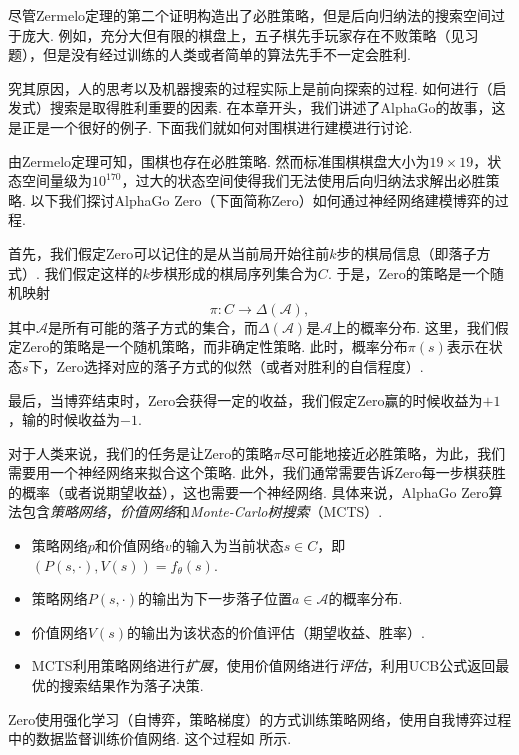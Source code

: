 尽管Zermelo定理的第二个证明构造出了必胜策略，但是后向归纳法的搜索空间过于庞大. 例如，充分大但有限的棋盘上，五子棋先手玩家存在不败策略（见习题），但是没有经过训练的人类或者简单的算法先手不一定会胜利. 

究其原因，人的思考以及机器搜索的过程实际上是前向探索的过程. 如何进行（启发式）搜索是取得胜利重要的因素. 在本章开头，我们讲述了AlphaGo的故事，这是正是一个很好的例子. 下面我们就如何对围棋进行建模进行讨论.

由Zermelo定理可知，围棋也存在必胜策略. 然而标准围棋棋盘大小为$19\times 19$，状态空间量级为$10^{170}$，过大的状态空间使得我们无法使用后向归纳法求解出必胜策略. 以下我们探讨AlphaGo Zero（下面简称Zero）如何通过神经网络建模博弈的过程.

首先，我们假定Zero可以记住的是从当前局开始往前$k$步的棋局信息（即落子方式）. 我们假定这样的$k$步棋形成的棋局序列集合为$C$. 于是，Zero的策略是一个随机映射
\[\pi: C\to \Delta(\mathcal A),\]
其中$\mathcal A$是所有可能的落子方式的集合，而$\Delta(\mathcal A)$是$\mathcal A$上的概率分布. 这里，我们假定Zero的策略是一个随机策略，而非确定性策略. 此时，概率分布$\pi(s)$表示在状态$s$下，Zero选择对应的落子方式的似然（或者对胜利的自信程度）.

最后，当博弈结束时，Zero会获得一定的收益，我们假定Zero赢的时候收益为$+1$，输的时候收益为$-1$. 

对于人类来说，我们的任务是让Zero的策略$\pi$尽可能地接近必胜策略，为此，我们需要用一个神经网络来拟合这个策略. 此外，我们通常需要告诉Zero每一步棋获胜的概率（或者说期望收益），这也需要一个神经网络. 具体来说，AlphaGo Zero算法包含\textit{策略网络}，\textit{价值网络}和\textit{Monte-Carlo树搜索}（MCTS）.
\begin{itemize}
    \item 策略网络$p$和价值网络$v$的输入为当前状态$s\in C$，即$(P(s,\cdot),V(s))=f_\theta(s)$.
    \item 策略网络$P(s,\cdot)$的输出为下一步落子位置$a\in\mathcal A$的概率分布.
    \item 价值网络$V(s)$的输出为该状态的价值评估（期望收益、胜率）.
    \item MCTS利用策略网络进行\textit{扩展}，使用价值网络进行\textit{评估}，利用UCB公式返回最优的搜索结果作为落子决策.
\end{itemize}

Zero使用强化学习（自博弈，策略梯度）的方式训练策略网络，使用自我博弈过程中的数据监督训练价值网络. 这个过程如 所示.

